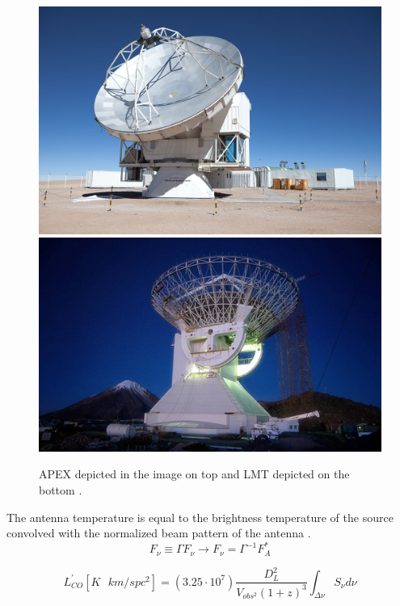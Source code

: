 \documentclass[reprint,english,notitlepage]{revtex4-2}  %
\begin{document}
\begin{figure}[h!]
    \centering
    \includegraphics[scale = 0.13]{apex-mar2009-1671.jpeg} \hfill
    \includegraphics[scale = 0.146]{galGTM16.jpeg}
    \caption{APEX depicted in the image on top \cite{APEX image} and LMT depicted on the bottom \cite{LMT image}.}
\end{figure}

The antenna temperature is equal to the brightness temperature of the source convolved with the normalized beam pattern of the antenna \cite{lecturenotes}.
\begin{equation} \label{eq: K/Jy}
    F_\nu \equiv \Gamma F_\nu \rightarrow F_\nu = \Gamma^{-1}F^*_A
\end{equation}



\begin{equation} \label{eq: luminosity}
    L_{CO}^{'}[K\textbf{ }km/s pc^2] = (3.25 \cdot 10^7)\frac{D_L^2}{V_{obs^2}(1 + z)^3} \int_{\Delta \nu}S_\nu d\nu
\end{equation}
\end{document}

